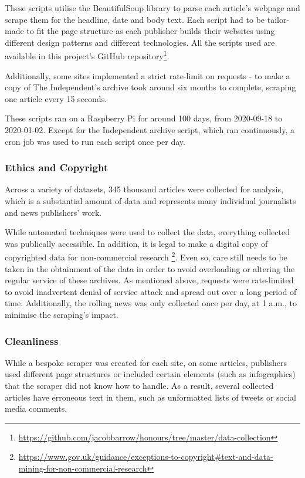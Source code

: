 These scripts utilise the BeautifulSoup library to parse each article's webpage and scrape them for the headline, date and body text. Each script had to be tailor-made to fit the page structure as each publisher builds their websites using different design patterns and different technologies. All the scripts used are available in this project's GitHub repository\footnote{\url{https://github.com/jacobbarrow/honours/tree/master/data-collection}}.

Additionally, some sites implemented a strict rate-limit on requests - to make a copy of The Independent's archive took around six months to complete, scraping one article every 15 seconds. 

These scripts ran on a Raspberry Pi for around 100 days, from 2020-09-18 to 2020-01-02. Except for the Independent archive script, which ran continuously, a cron job was used to run each script once per day.

\subsubsection{Ethics and Copyright}
Across a variety of datasets, 345 thousand articles were collected for analysis, which is a substantial amount of data and represents many individual journalists and news publishers' work. 

While automated techniques were used to collect the data, everything collected was publically accessible. In addition, it is legal to make a digital copy of copyrighted data for non-commercial research \footnote{\url{https://www.gov.uk/guidance/exceptions-to-copyright#text-and-data-mining-for-non-commercial-research}}. Even so, care still needs to be taken in the obtainment of the data in order to avoid overloading or altering the regular service of these archives. As mentioned above, requests were rate-limited to avoid inadvertent denial of service attack and spread out over a long period of time. Additionally, the rolling news was only collected once per day, at 1 a.m., to minimise the scraping's impact.

\subsubsection{Cleanliness}
While a bespoke scraper was created for each site, on some articles, publishers used different page structures or included certain elements (such as infographics) that the scraper did not know how to handle. As a result, several collected articles have erroneous text in them, such as unformatted lists of tweets or social media comments.

